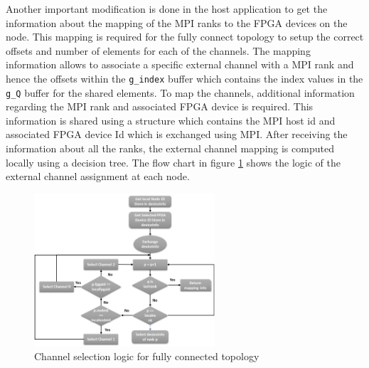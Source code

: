 Another important modification is done in the host application to get the information about
the mapping of the MPI ranks to the FPGA devices on the node. This mapping is required for the
fully connect topology to setup the correct offsets and number of elements for each of the channels.
The mapping information allows to associate a specific external channel with a MPI rank and hence the
offsets within the \texttt{g\_index} buffer which contains the index values in the \texttt{g\_Q}
buffer for the shared elements. To map the channels, additional information
regarding the MPI rank and associated FPGA device is required. This information is shared using
a structure which contains the MPI host id and associated FPGA device Id which is exchanged
using MPI. After receiving the information about all the ranks, the external channel mapping
is computed locally using a decision tree. The flow chart in figure \ref{fig:channel_select}
shows the logic of the external channel assignment at each node.
\begin{figure}[ht]%
    \centering
    \includegraphics[width=0.6\textwidth]{images/channel_select}
    \caption{Channel selection logic for fully connected topology}
    \label{fig:channel_select}
\end{figure}

